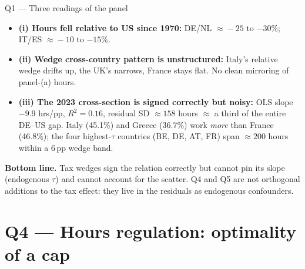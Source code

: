 \documentclass{beamer}
\begin{document}
\begin{frame}{Q1 --- Three readings of the panel}
\begin{itemize}\setlength{\itemsep}{8pt}
    \item \textbf{(i) Hours fell relative to US since 1970:} DE/NL $\approx\!-25$ to $-30\%$; IT/ES $\approx\!-10$ to $-15\%$.
    \item \textbf{(ii) Wedge cross-country pattern is unstructured:} Italy's relative wedge drifts up, the UK's narrows, France stays flat. No clean mirroring of panel-(a) hours.
    \item \textbf{(iii) The 2023 cross-section is signed correctly but noisy:} OLS slope $-9.9$ hrs/pp, $R^{2}\!=\!0.16$, residual SD $\approx\!158$ hours $\approx$ a third of the entire DE--US gap. Italy (45.1\%) and Greece (36.7\%) work \emph{more} than France (46.8\%); the four highest-$\tau$ countries (BE, DE, AT, FR) span $\approx\!200$ hours within a 6\,pp wedge band.
\end{itemize}

\vspace{0.3em}
\textbf{Bottom line.} Tax wedges sign the relation correctly but cannot pin its slope (endogenous $\tau$) and cannot account for the scatter. Q4 and Q5 are not orthogonal additions to the tax effect: they live in the residuals as endogenous confounders.
\end{frame}

\section{Q4 --- Hours regulation: optimality of a cap}
\end{document}
